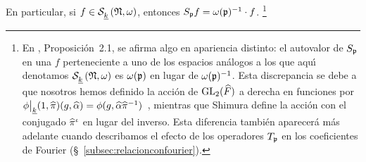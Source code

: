 En particular, si $f\in\spitzH{k}{\frak{N},\omega}$, entonces
$S_{\frak{p}}f=\omega(\frak{p})^{-1}\cdot f$.%
\footnote{\label{obs:shimuradiferenciaenelautovalor}
	En \cite{ShimuraSpecialValuesOfZeta},
	Proposici\'{o}n~2.1, se afirma algo en apariencia distinto: el
	autovalor de $S_{\frak{p}}$ en una $f$ perteneciente a uno de los
	espacios an\'{a}logos a los que aqu\'{\i} denotamos
	$\spitzH{k}{\frak{N},\omega}$ es $\omega(\frak{p})$ en lugar de
	$\omega(\frak{p})^{-1}$. Esta discrepancia se debe a que nosotros hemos
	definido la acci\'{o}n de $\GL_{2}(\Adfin{F})$ a derecha en funciones
	por
	\begin{math}
		\phi\operadormatrices{\peso{k}}{(1,\hhat{\pi})}
			(g,\hhat{\alpha})=\phi(g,\hhat{\alpha}\hhat{\pi}^{-1})
	\end{math}~,
	mientras que Shimura define la acci\'{o}n con el conjugado
	$\hhat{\pi}^\iota$ en lugar del inverso. Esta diferencia tambi\'{e}n
	aparecer\'{a} m\'{a}s adelante cuando describamos el efecto de los
	operadores $T_{\frak{p}}$ en los coeficientes de Fourier
	(\S~\ref{subsec:relacionconfourier}).
}

